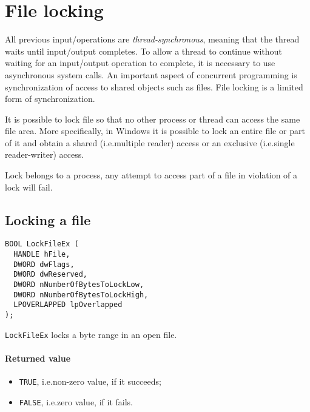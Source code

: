 \section{File locking}
All previous input/operations are \emph{thread-synchronous}, meaning that the thread waits until input/output completes. To allow a thread to continue without waiting for an input/output operation to complete, it is necessary to use asynchronous system calls. An important aspect of concurrent programming is synchronization of access to shared objects such as files. File locking is a limited form of synchronization.

It is possible to lock file so that no other process or thread can access the same file area. More specifically, in Windows it is possible to lock an entire file or part of it and obtain a shared (i.e.\@ multiple reader) access or an exclusive (i.e.\@ single reader-writer) access.

Lock belongs to a process, any attempt to access part of a file in violation of a lock will fail.

\subsection{Locking a file}
\begin{verbatim}
BOOL LockFileEx (
  HANDLE hFile,
  DWORD dwFlags,
  DWORD dwReserved,
  DWORD nNumberOfBytesToLockLow,
  DWORD nNumberOfBytesToLockHigh,
  LPOVERLAPPED lpOverlapped
);
\end{verbatim}

\texttt{LockFileEx} locks a byte range in an open file.

\paragraph{Returned value}
\begin{itemize}
\item \texttt{TRUE}, i.e.\@ non-zero value, if it succeeds;
\item \texttt{FALSE}, i.e.\@ zero value, if it fails.
\end{itemize}

